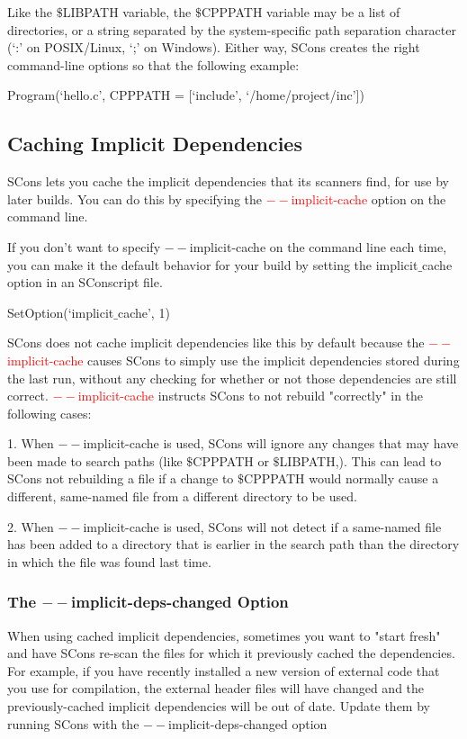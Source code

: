 \documentclass[12pt,a4paper]{article}
\begin{document}
Like the $\$$LIBPATH variable, the $\$$CPPPATH variable may be a list of directories, or a string separated by the system-specific path separation character (`:' on POSIX/Linux, `;' on Windows). Either way, SCons creates the right command-line options so that the following example:

Program(`hello.c', CPPPATH = [`include', `/home/project/inc'])

\subsection{Caching Implicit Dependencies}
SCons lets you cache the implicit dependencies that its scanners find, for use by later builds. You can do this by specifying the \textcolor{red}{$--$implicit-cache} option on the command line.

If you don't want to specify $--$implicit-cache on the command line each time, you can make it the default behavior for your build by setting the implicit$\_$cache option in an SConscript file.

SetOption(`implicit$\_$cache', 1)

SCons does not cache implicit dependencies like this by default because the \textcolor{red}{$--$implicit-cache} causes SCons to simply use the implicit dependencies stored during the last run, without any checking for whether or not those dependencies are still correct.  \textcolor{red}{$--$implicit-cache} instructs SCons to not rebuild "correctly" in the following cases:

1. When $--$implicit-cache is used, SCons will ignore any changes that may have been made to search paths (like $\$$CPPPATH or $\$$LIBPATH,). This can lead to SCons not rebuilding a file if a change to $\$$CPPPATH would normally cause a different, same-named file from a different directory to be used.

2. When $--$implicit-cache is used, SCons will not detect if a same-named file has been added to a directory that is earlier in the search path than the directory in which the file was found last time.

\subsubsection{The $--$implicit-deps-changed Option}
When using cached implicit dependencies, sometimes you want to "start fresh" and have SCons re-scan the files for which it previously cached the dependencies. For example, if you have recently installed a new version of external code that you use for compilation, the external header files will have changed and the previously-cached implicit dependencies will be out of date. Update them by running SCons with the $--$implicit-deps-changed option
\end{document}
